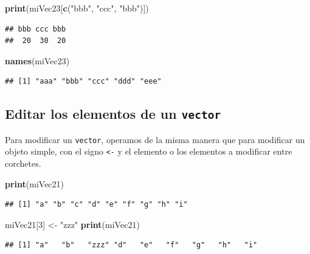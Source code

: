 \documentclass[]{book}
\newenvironment{Shaded}{\begin{snugshade}}{\end{snugshade}}
\newcommand{\KeywordTok}[1]{\textcolor[rgb]{0.13,0.29,0.53}{\textbf{#1}}}
\newcommand{\DecValTok}[1]{\textcolor[rgb]{0.00,0.00,0.81}{#1}}
\newcommand{\StringTok}[1]{\textcolor[rgb]{0.31,0.60,0.02}{#1}}
\newcommand{\NormalTok}[1]{#1}
\begin{document}
\begin{Shaded}
\begin{Highlighting}[]
\KeywordTok{print}\NormalTok{(miVec23[}\KeywordTok{c}\NormalTok{(}\StringTok{"bbb"}\NormalTok{, }\StringTok{"ccc"}\NormalTok{, }\StringTok{"bbb"}\NormalTok{)])}
\end{Highlighting}
\end{Shaded}

\begin{verbatim}
## bbb ccc bbb 
##  20  30  20
\end{verbatim}

\begin{Shaded}
\begin{Highlighting}[]
\KeywordTok{names}\NormalTok{(miVec23)}
\end{Highlighting}
\end{Shaded}

\begin{verbatim}
## [1] "aaa" "bbb" "ccc" "ddd" "eee"
\end{verbatim}

\subsection{\texorpdfstring{Editar los elementos de un
\texttt{vector}}{Editar los elementos de un vector}}\label{editar-los-elementos-de-un-vector}

Para modificar un \texttt{vector}, operamos de la misma manera que para
modificar un objeto simple, con el signo \texttt{\textless{}-} y el
elemento o los elementos a modificar entre corchetes.

\begin{Shaded}
\begin{Highlighting}[]
\KeywordTok{print}\NormalTok{(miVec21)}
\end{Highlighting}
\end{Shaded}

\begin{verbatim}
## [1] "a" "b" "c" "d" "e" "f" "g" "h" "i"
\end{verbatim}

\begin{Shaded}
\begin{Highlighting}[]
\NormalTok{miVec21[}\DecValTok{3}\NormalTok{] <-}\StringTok{ "zzz"}
\KeywordTok{print}\NormalTok{(miVec21)}
\end{Highlighting}
\end{Shaded}

\begin{verbatim}
## [1] "a"   "b"   "zzz" "d"   "e"   "f"   "g"   "h"   "i"
\end{verbatim}
\end{document}
